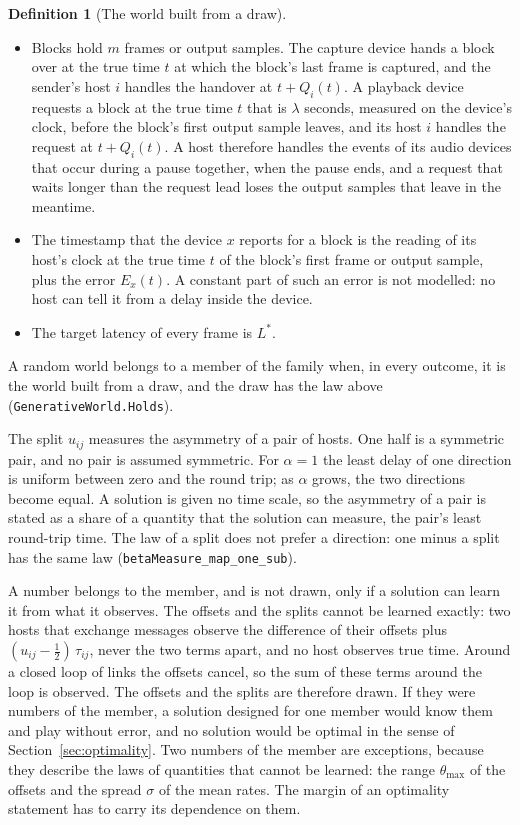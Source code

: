 \documentclass[11pt,a4paper]{article}
\newcommand{\lean}[1]{\texttt{#1}}
\theoremstyle{definition}
\newtheorem{definition}{Definition}[section]
\begin{document}
\begin{definition}[The world built from a draw]
\begin{itemize}
\item Blocks hold $m$ frames or output samples. The capture device hands a
  block over at the true time $t$ at which the block's last frame is
  captured, and the sender's host $i$ handles the handover at
  $t + Q_i(t)$. A playback device requests a block at the true time $t$
  that is $\lambda$ seconds, measured on the device's clock, before the
  block's first output sample leaves, and its host $i$ handles the request
  at $t + Q_i(t)$. A host therefore handles the events of its audio
  devices that occur during a pause together, when the pause ends, and a
  request that waits longer than the request lead loses the output samples
  that leave in the meantime.
\item The timestamp that the device $x$ reports for a block is the reading
  of its host's clock at the true time $t$ of the block's first frame or
  output sample, plus the error $E_x(t)$. A constant part of such an error
  is not modelled: no host can tell it from a delay inside the device.
\item The target latency of every frame is $L^*$.
\end{itemize}
A random world belongs to a member of the family when, in every outcome, it
is the world built from a draw, and the draw has the law above
(\lean{GenerativeWorld.\allowbreak Holds}).
\end{definition}

The split $u_{ij}$ measures the asymmetry of a pair of hosts. One half is a
symmetric pair, and no pair is assumed symmetric. For $\alpha = 1$ the least
delay of one direction is uniform between zero and the round trip; as
$\alpha$ grows, the two directions become equal. A solution is given no
time scale, so the asymmetry of a pair is stated as a share of a quantity
that the solution can measure, the pair's least round-trip time. The law of
a split does not prefer a direction: one minus a split has the same law
(\lean{betaMeasure\_map\_one\_sub}).

A number belongs to the member, and is not drawn, only if a solution can
learn it from what it observes.
The offsets and the splits cannot be learned exactly: two hosts that
exchange messages observe the difference of their offsets plus
$(u_{ij} - \tfrac12)\,\tau_{ij}$, never the two terms apart, and no host
observes true time. Around a closed loop of links the offsets cancel, so
the sum of these terms around the loop is observed. The offsets and the
splits are therefore drawn. If they were numbers of the member, a solution
designed for one member would know them and play without error, and no
solution would be optimal in the sense of Section~\ref{sec:optimality}. Two
numbers of the member are exceptions, because they describe the laws of quantities
that cannot be learned: the range $\theta_{\max}$ of the offsets and the
spread $\sigma$ of the mean rates. The margin of an optimality statement
has to carry its dependence on them.
\end{document}
